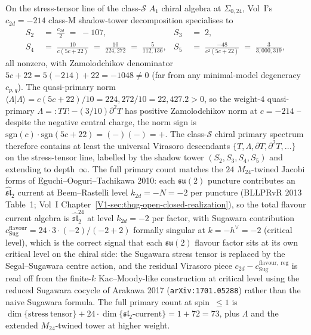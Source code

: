 \begin{remark}[Shadow-tower spectrum at $c=-214$]
\label{rem:anomtop-c214-spectrum}
On the stress-tensor line of the class-$\mathcal S$ $A_1$ chiral
algebra at $\Sigma_{0,24}$, Vol~I's $c_{2d}=-214$
class-$\mathrm M$ shadow-tower decomposition specialises to
\begin{align*}
 S_2 \;&=\; \tfrac{c_{2d}}{2} \;=\; -107,
 &
 S_3 \;&=\; 2,
 \\
 S_4 \;&=\; \frac{10}{c(5c+22)} \;=\; \frac{10}{224{,}272}
 \;=\; \frac{5}{112{,}136},
 &
 S_5 \;&=\; \frac{-48}{c^2(5c+22)} \;=\; \frac{3}{3{,}000{,}319},
\end{align*}
all nonzero, with Zamolodchikov denominator
$5c + 22 = 5(-214) + 22 = -1048 \ne 0$ (far from any minimal-model
degeneracy $c_{p,q}$). The quasi-primary norm
$\langle\Lambda|\Lambda\rangle = c(5c+22)/10 = 224{,}272/10
= 22{,}427.2 > 0$, so the weight-$4$ quasi-primary
$\Lambda = {:}TT{:} - (3/10)\partial^2 T$ has positive Zamolodchikov
norm at $c=-214$ -- despite the negative central charge, the norm
sign is $\mathrm{sgn}(c)\cdot\mathrm{sgn}(5c+22) = (-)(-) = +$. The
class-$\mathcal S$ chiral primary spectrum therefore contains at
least the universal Virasoro descendants $\{T, \Lambda, \partial T,
\partial^2 T, \ldots\}$ on the stress-tensor line, labelled by the
shadow tower $(S_2, S_3, S_4, S_5)$ and extending to
depth~$\infty$. The full primary count matches the $24$
$M_{24}$-twined Jacobi forms of Eguchi--Ooguri--Tachikawa 2010:
each $\mathfrak{su}(2)$ puncture contributes an
$\widehat{\mathfrak{sl}}_2$ current at Beem--Rastelli level
$k_{2d} = -N = -2$ per puncture (BLLPRvR 2013 Table~1; Vol~I
Chapter~\ref{V1-sec:thqg-open-closed-realization}),
so the total flavour current algebra is
$\widehat{\mathfrak{sl}}_2^{24}$ at level $k_{2d} = -2$ per factor,
with Sugawara contribution
$c_{\mathrm{Sug}}^{\mathrm{flavour}} = 24\cdot 3\cdot(-2)/(-2+2)$
formally singular at $k = -h^\vee = -2$ (critical level), which is
the correct signal that each $\mathfrak{su}(2)$ flavour factor
sits at its own critical level on the chiral side: the Sugawara
stress tensor is replaced by the Segal--Sugawara centre action, and
the residual Virasoro piece
$c_{2d} - c_{\mathrm{Sug}}^{\mathrm{flavour,\ reg}}$ is read off
from the finite-$k$ Kac--Moody-like construction at critical level
using the reduced Sugawara cocycle of Arakawa 2017
(\texttt{arXiv:1701.05288}) rather than the naive Sugawara formula.
The full primary count at spin~$\le 1$ is
$\dim\{\mathrm{stress\ tensor}\}
+ 24\cdot\dim\{\mathfrak{sl}_2\text{-current}\}
= 1 + 72 = 73$, plus $\Lambda$ and the extended $M_{24}$-twined
tower at higher weight.
\end{remark}

